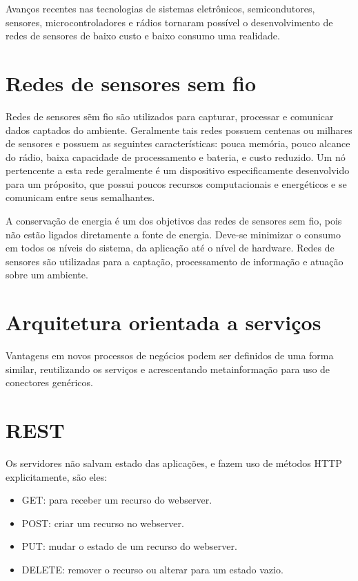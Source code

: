 Avan\c{c}os recentes nas tecnologias de sistemas eletr\^onicos, semicondutores, sensores, microcontroladores e r\'adios tornaram poss\'ivel o desenvolvimento de redes de sensores de baixo custo e baixo consumo uma realidade.
\section{Redes de sensores sem fio}

Redes de sensores sẽm fio s\~ao utilizados para capturar, processar e comunicar dados captados do ambiente. Geralmente tais redes possuem centenas ou milhares de sensores e possuem as seguintes caracter\'isticas: pouca mem\'oria, pouco alcance do r\'adio, baixa capacidade de processamento e bateria, e custo reduzido. Um n\'o pertencente a esta rede geralmente \'e um dispositivo especificamente desenvolvido para um pr\'oposito, que possui poucos recursos computacionais e energ\'eticos e se comunicam entre seus semalhantes.

A conserva\c{c}\~ao de energia \'e um dos objetivos das redes de sensores sem fio, pois n\~ao est\~ao ligados diretamente a fonte de energia. Deve-se minimizar o consumo em todos os n\'iveis do sistema, da aplica\c{c}\~ao at\'e o n\'ivel de hardware. Redes de sensores s\~ao utilizadas para a capta\c{c}\~ao, processamento de informa\c{c}\~ao e atua\c{c}\~ao sobre um ambiente.


\section{Arquitetura orientada a servi\c{c}os}
Vantagens em novos processos de neg\'ocios podem ser definidos de uma forma similar, reutilizando os servi\c{c}os e acrescentando metainforma\c{c}\~ao para uso de conectores gen\'ericos.
\cite{perrey2003service}


\section{REST}

Os servidores n\~ao salvam estado das aplica\c{c}\~oes, e fazem uso de m\'etodos HTTP explicitamente, s\~ao eles:
\begin{itemize}
    \item GET: para receber um recurso do webserver.
    \item POST: criar um recurso no webserver.
    \item PUT: mudar o estado de um recurso do webserver.
    \item DELETE: remover o recurso ou alterar para um estado vazio.
\end{itemize}

